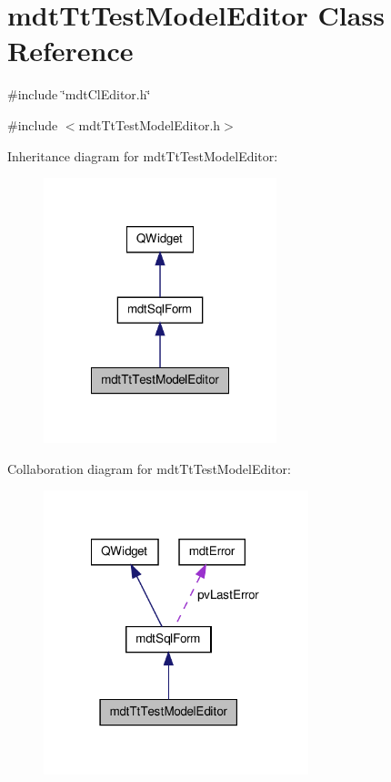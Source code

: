 \hypertarget{classmdt_tt_test_model_editor}{\section{mdt\-Tt\-Test\-Model\-Editor Class Reference}
\label{classmdt_tt_test_model_editor}
}


\#include \char`\"{}mdt\-Cl\-Editor.\-h\char`\"{}  




{\ttfamily \#include $<$mdt\-Tt\-Test\-Model\-Editor.\-h$>$}



Inheritance diagram for mdt\-Tt\-Test\-Model\-Editor\-:
\nopagebreak
\begin{figure}[H]
\begin{center}
\leavevmode
\includegraphics[width=192pt]{classmdt_tt_test_model_editor__inherit__graph}
\end{center}
\end{figure}


Collaboration diagram for mdt\-Tt\-Test\-Model\-Editor\-:
\nopagebreak
\begin{figure}[H]
\begin{center}
\leavevmode
\includegraphics[width=218pt]{classmdt_tt_test_model_editor__coll__graph}
\end{center}
\end{figure}

